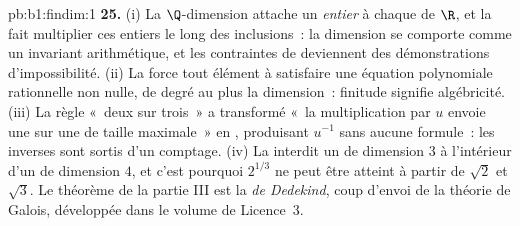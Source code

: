 \begin{solution}{pb:b1:findim:1}
\textbf{25.} (i) La $\Q$-dimension attache un \emph{entier} à
chaque  de $\R$, et la  fait multiplier
ces entiers le long des inclusions~: la dimension se comporte comme un
invariant arithmétique, et les contraintes de  deviennent
des démonstrations d'impossibilité. (ii) La  force
tout élément à satisfaire une équation polynomiale rationnelle non
nulle, de degré au plus la dimension~: finitude signifie
algébricité. (iii) La règle «~deux sur trois~» a transformé «~la
multiplication par $u$ envoie une  sur une  de taille
maximale~» en , produisant $u^{-1}$ sans aucune formule~:
les inverses sont sortis d'un comptage. (iv) La 
interdit un  de dimension $3$ à l'intérieur d'un  de
dimension $4$, et c'est pourquoi $2^{1/3}$ ne peut être atteint à
partir de $\sqrt2$ et $\sqrt3$. Le théorème de la partie III est la
\emph{ de Dedekind}, coup d'envoi de la théorie de
Galois, développée dans le volume de Licence~3.
\end{solution}

